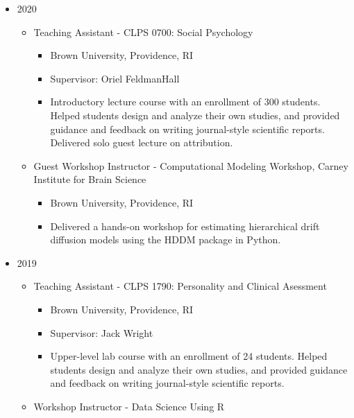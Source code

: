 \documentclass[
]{article}
\providecommand{\tightlist}{%
  \setlength{\itemsep}{0pt}\setlength{\parskip}{0pt}}
\begin{document}
\begin{itemize}
\item
  2020

  \begin{itemize}
  \item
    Teaching Assistant - CLPS 0700: Social Psychology

    \begin{itemize}
    \tightlist
    \item
      Brown University, Providence, RI
    \item
      Supervisor: Oriel FeldmanHall
    \item
      Introductory lecture course with an enrollment of 300 students.
      Helped students design and analyze their own studies, and provided
      guidance and feedback on writing journal-style scientific reports.
      Delivered solo guest lecture on attribution.
    \end{itemize}
  \item
    Guest Workshop Instructor - Computational Modeling Workshop, Carney
    Institute for Brain Science

    \begin{itemize}
    \tightlist
    \item
      Brown University, Providence, RI
    \item
      Delivered a hands-on workshop for estimating hierarchical drift
      diffusion models using the HDDM package in Python.
    \end{itemize}
  \end{itemize}
\item
  2019

  \begin{itemize}
  \item
    Teaching Assistant - CLPS 1790: Personality and Clinical Asessment

    \begin{itemize}
    \tightlist
    \item
      Brown University, Providence, RI
    \item
      Supervisor: Jack Wright
    \item
      Upper-level lab course with an enrollment of 24 students. Helped
      students design and analyze their own studies, and provided
      guidance and feedback on writing journal-style scientific reports.
    \end{itemize}
  \item
    Workshop Instructor - Data Science Using R


\end{itemize}
\end{itemize}
\end{document}
